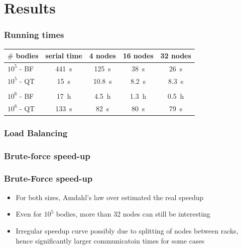 \section{Results}

\begin{frame}
\frametitle{Running times}
\begin{center}
\begin{tabular}{l|cccc}
  $\#$ bodies & serial time & 4 nodes & 16 nodes & 32 nodes\\
  \hline  $10^5$ - BF & \SI{441}{s} & \SI{125}{s} & \SI{38}{s} & \SI{26}{s}  \\
  $10^5$ - QT & \SI{15}{s} & \SI{10.8}{s} & \SI{8.2}{s} & \SI{8.3}{s} \\
  \\
  $10^6$ - BF & \SI{17}{h} & \SI{4.5}{h} & \SI{1.3}{h} & \SI{0.5}{h}  \\
  $10^6$ - QT & \SI{133}{s} & \SI{82}{s} & \SI{80}{s} & \SI{79}{s} \\
\end{tabular}
\end{center}
\end{frame}

\begin{frame}
  \frametitle{Load Balancing}
  \begin{center}
  \end{center}
\end{frame}

\begin{frame}
  \frametitle{Brute-force speed-up}
\end{frame}

\begin{frame}
\frametitle{Brute-Force speed-up}
\begin{itemize}
  \item For both sizes, Amdahl's law over estimated the real speedup
  \item Even for $10^5$ bodies, more than 32 nodes can still be interesting
  \item Irregular speedup curve possibly due to splitting of nodes between racks, hence significantly larger communicatoin times for some cases
\end{itemize}
\end{frame}

